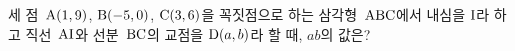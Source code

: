 세 점~$\mathrm{A}(1{,}\mkern3mu\mathopen{}9)$, $\mathrm{B}(-5{,}\mkern3mu\mathopen{}0)$, $\mathrm{C}(3{,}\mkern3mu\mathopen{}6)$을 꼭짓점으로 하는 삼각형~$\mathrm{ABC}$에서 내심을 $\mathrm{I}$라 하고 직선~$\mathrm{AI}$와 선분~$\mathrm{BC}$의 교점을 $\mathrm{D}(a{,}\mkern3mu\mathopen{}b)$라 할 때, $ab$의 값은?
